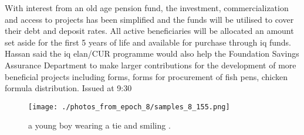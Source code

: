 \documentclass{article}%
\begin{document}
With interest from an old age pension fund, the investment, commercialization and access to projects has been simplified and the funds will be utilised to cover their debt and deposit rates. All active beneficiaries will be allocated an amount set aside for the first 5 years of life and available for purchase through iq funds.\newline%
Hassan said the iq elan/CUR programme would also help the Foundation Savings Assurance Department to make larger contributions for the development of more beneficial projects including forms, forms for procurement of fish pens, chicken formula distribution.\newline%
Issued at 9:30\newline%

%


\begin{figure}[h!]%
\centering%
\texttt{[image: ./photos\_from\_epoch\_8/samples\_8\_155.png]}%
\caption{a young boy wearing a tie and smiling .}%
\end{figure}

%
\end{document}
